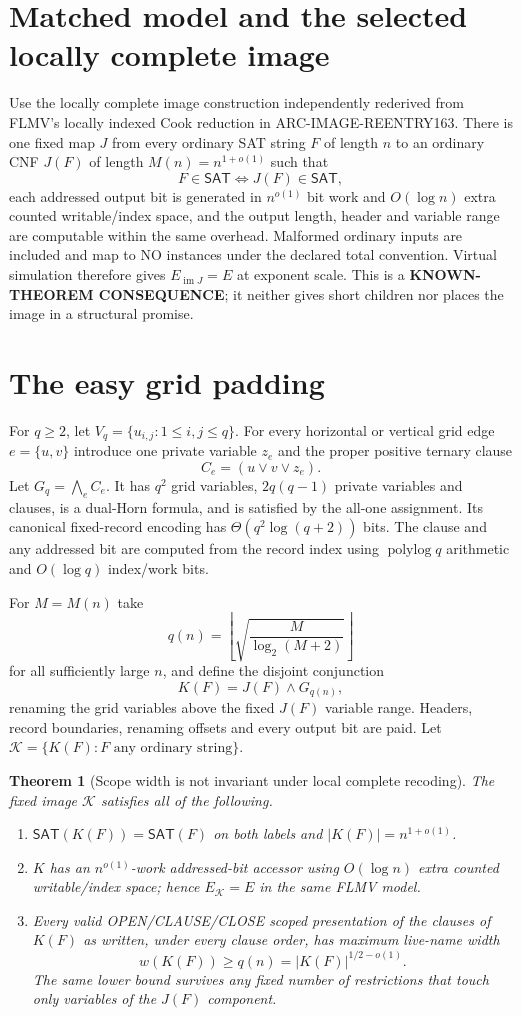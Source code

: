 \documentclass[11pt]{article}
\newtheorem{theorem}{Theorem}
\newcommand{\SAT}{\mathsf{SAT}}
\begin{document}
\section{Matched model and the selected locally complete image}
Use the locally complete image construction independently rederived from
FLMV's locally indexed Cook reduction in
ARC-IMAGE-REENTRY163.  There is one fixed map $J$ from every ordinary SAT
string $F$ of length $n$ to an ordinary CNF $J(F)$ of length
$M(n)=n^{1+o(1)}$ such that
\[
 F\in\SAT\iff J(F)\in\SAT,
\]
each addressed output bit is generated in $n^{o(1)}$ bit work and
$O(\log n)$ extra counted writable/index space, and the output length,
header and variable range are computable within the same overhead.  Malformed
ordinary inputs are included and map to NO instances under the declared
total convention.  Virtual simulation therefore gives
$E_{\operatorname{im}J}=E$ at exponent scale.  This is a
\textbf{KNOWN-THEOREM CONSEQUENCE}; it neither gives short children nor
places the image in a structural promise.

\section{The easy grid padding}
For $q\ge2$, let $V_q=\{u_{i,j}:1\le i,j\le q\}$.  For every horizontal or
vertical grid edge $e=\{u,v\}$ introduce one private variable $z_e$ and the
proper positive ternary clause
\[
 C_e=(u\vee v\vee z_e).
\]
Let $G_q=\bigwedge_e C_e$.  It has $q^2$ grid variables,
$2q(q-1)$ private variables and clauses, is a dual-Horn formula, and is
satisfied by the all-one assignment.  Its canonical fixed-record encoding
has $\Theta(q^2\log(q+2))$ bits.  The clause and any addressed bit are
computed from the record index using $\operatorname{polylog}q$ arithmetic
and $O(\log q)$ index/work bits.

For $M=M(n)$ take
\[
 q(n)=\left\lfloor\sqrt{\frac{M}{\log_2(M+2)}}\right\rfloor
\]
for all sufficiently large $n$, and define the disjoint conjunction
\[
 K(F)=J(F)\wedge G_{q(n)},
\]
renaming the grid variables above the fixed $J(F)$ variable range.  Headers,
record boundaries, renaming offsets and every output bit are paid.  Let
$\mathcal K=\{K(F):F\text{ any ordinary string}\}$.

\begin{theorem}[Scope width is not invariant under local complete recoding]
\label{th:main}
The fixed image $\mathcal K$ satisfies all of the following.
\begin{enumerate}
\item $\SAT(K(F))=\SAT(F)$ on both labels and
$|K(F)|=n^{1+o(1)}$.
\item $K$ has an $n^{o(1)}$-work addressed-bit accessor using
$O(\log n)$ extra counted writable/index space; hence
$E_{\mathcal K}=E$ in the same FLMV model.
\item Every valid OPEN/CLAUSE/CLOSE scoped presentation of the clauses of
$K(F)$ \emph{as written}, under every clause order, has maximum live-name
width
\[
 w(K(F))\ge q(n)=|K(F)|^{1/2-o(1)}.
\]
The same lower bound survives any fixed number of restrictions that touch
only variables of the $J(F)$ component.
\end{enumerate}
\end{theorem}
\end{document}
